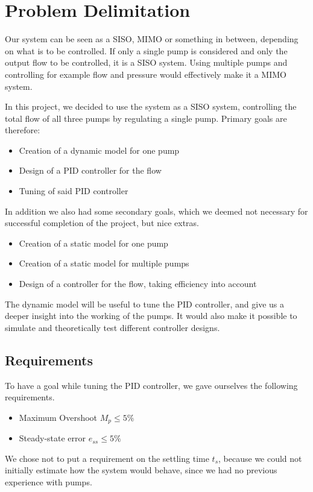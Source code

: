 \section{Problem Delimitation}
Our system can be seen as a SISO, MIMO or something in between,
depending on what is to be controlled.
If only a single pump is considered and only the output flow to be controlled,
it is a SISO system.
Using multiple pumps and controlling for example flow and pressure would effectively make it a MIMO system.

In this project,
we decided to use the system as a SISO system,
controlling the total flow of all three pumps by regulating a single pump.
Primary goals are therefore:

\begin{itemize}
\item Creation of a dynamic model for one pump
\item Design of a PID controller for the flow
\item Tuning of said PID controller 
\end{itemize}

In addition we also had some secondary goals,
which we deemed not necessary for successful completion of the project,
but nice extras.

\begin{itemize}
\item Creation of a static model for one pump
\item Creation of a static model for multiple pumps
\item Design of a controller for the flow, taking efficiency into account
\end{itemize}

The dynamic model will be useful to tune the PID controller,
and give us a deeper insight into the working of the pumps.
It would also make it possible to simulate and theoretically test different controller designs.


\subsection{Requirements}
To have a goal while tuning the PID controller,
we gave ourselves the following requirements.

\begin{itemize}
\item Maximum Overshoot $M_p \leq 5\%$
\item Steady-state error $e_{ss} \leq 5 \%$
\end{itemize}

We chose not to put a requirement on the settling time $t_s$,
because we could not initially estimate how the system would behave,
since we had no previous experience with pumps.